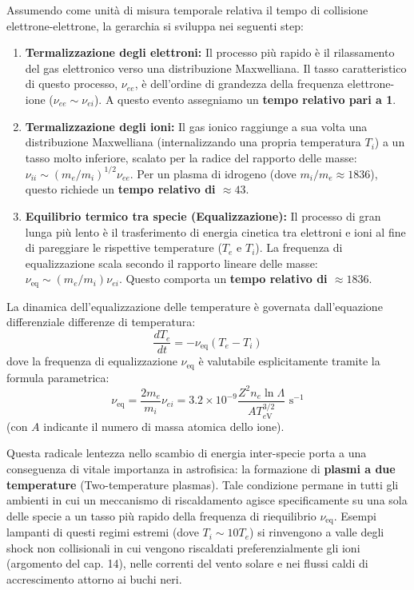 Assumendo come unità di misura temporale relativa il tempo di collisione elettrone-elettrone, la gerarchia si sviluppa nei seguenti step:
\begin{enumerate}
\item \textbf{Termalizzazione degli elettroni:} Il processo più rapido è il rilassamento del gas elettronico verso una distribuzione Maxwelliana. Il tasso caratteristico di questo processo, $\nu_{ee}$, è dell'ordine di grandezza della frequenza elettrone-ione ($\nu_{ee} \sim \nu_{ei}$). A questo evento assegniamo un \textbf{tempo relativo pari a 1}.
\item \textbf{Termalizzazione degli ioni:} Il gas ionico raggiunge a sua volta una distribuzione Maxwelliana (internalizzando una propria temperatura $T_i$) a un tasso molto inferiore, scalato per la radice del rapporto delle masse: $\nu_{ii} \sim (m_e/m_i)^{1/2} \nu_{ee}$. Per un plasma di idrogeno (dove $m_i/m_e \approx 1836$), questo richiede un \textbf{tempo relativo di $\approx 43$}.
\item \textbf{Equilibrio termico tra specie (Equalizzazione):} Il processo di gran lunga più lento è il trasferimento di energia cinetica tra elettroni e ioni al fine di pareggiare le rispettive temperature ($T_e$ e $T_i$). La frequenza di equalizzazione scala secondo il rapporto lineare delle masse: $\nu_{\text{eq}} \sim (m_e/m_i)\nu_{ei}$. Questo comporta un \textbf{tempo relativo di $\approx 1836$}.
\end{enumerate}

La dinamica dell'equalizzazione delle temperature è governata dall'equazione differenziale differenze di temperatura:
\begin{equation}
\frac{dT_e}{dt} = -\nu_{\text{eq}}(T_e - T_i)
\end{equation}
dove la frequenza di equalizzazione $\nu_{\text{eq}}$ è valutabile esplicitamente tramite la formula parametrica:
\begin{equation}
\nu_{\text{eq}} = \frac{2m_e}{m_i} \nu_{ei} = 3.2 \times 10^{-9} \frac{Z^2 n_e \ln \Lambda}{A T_{e\text{V}}^{3/2}} \text{ s}^{-1}
\end{equation}
(con $A$ indicante il numero di massa atomica dello ione).

Questa radicale lentezza nello scambio di energia inter-specie porta a una conseguenza di vitale importanza in astrofisica: la formazione di \textbf{plasmi a due temperature} (Two-temperature plasmas). Tale condizione permane in tutti gli ambienti in cui un meccanismo di riscaldamento agisce specificamente su una sola delle specie a un tasso più rapido della frequenza di riequilibrio $\nu_{\text{eq}}$. Esempi lampanti di questi regimi estremi (dove $T_i \sim 10 T_e$) si rinvengono a valle degli shock non collisionali in cui vengono riscaldati preferenzialmente gli ioni (argomento del cap. 14), nelle correnti del vento solare e nei flussi caldi di accrescimento attorno ai buchi neri.

